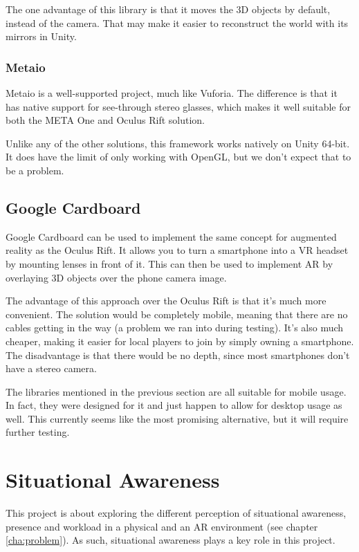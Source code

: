 				The one advantage of this library is that it moves the 3D
				objects by default, instead of the camera. That may make it
				easier to reconstruct the world with its mirrors in Unity.

			\subsubsection{Metaio} \label{sssec:metaio}
				Metaio is a well-supported project, much like Vuforia. The
				difference is that it has native support for see-through stereo
				glasses, which makes it well suitable for both the META One and
				Oculus Rift solution. \cite{metaio}

				Unlike any of the other solutions, this framework works
				natively on Unity 64-bit. It does have the limit of only working
				with OpenGL, but we don't expect that to be a problem.

		\subsection{Google Cardboard} \label{ssec:cardboard}

		Google Cardboard can be used to implement the same concept for augmented
		reality as the Oculus Rift. It allows you to turn a smartphone into a VR
		headset by mounting lenses in front of it. This can then be used to
		implement AR by overlaying 3D objects over the phone camera image.
		\cite{cardboard}

		The advantage of this approach over the Oculus Rift is that it's much
		more convenient. The solution would be completely mobile, meaning that
		there are no cables getting in the way (a problem we ran into during
		testing). It's also much cheaper, making it easier for local players to
		join by simply owning a smartphone. The disadvantage is that there would
		be no depth, since most smartphones don't have a stereo camera.

		The libraries mentioned in the previous section are all suitable for
		mobile usage. In fact, they were designed for it and just happen to
		allow for desktop usage as well. This currently seems like the most
		promising alternative, but it will require further testing.

	\section{Situational Awareness} \label{sec:awareness}
		This project is about exploring the different perception of situational
		awareness, presence and workload in a physical and an AR environment
		(see chapter \ref{cha:problem}). As such, situational awareness plays a
		key role in this project.

